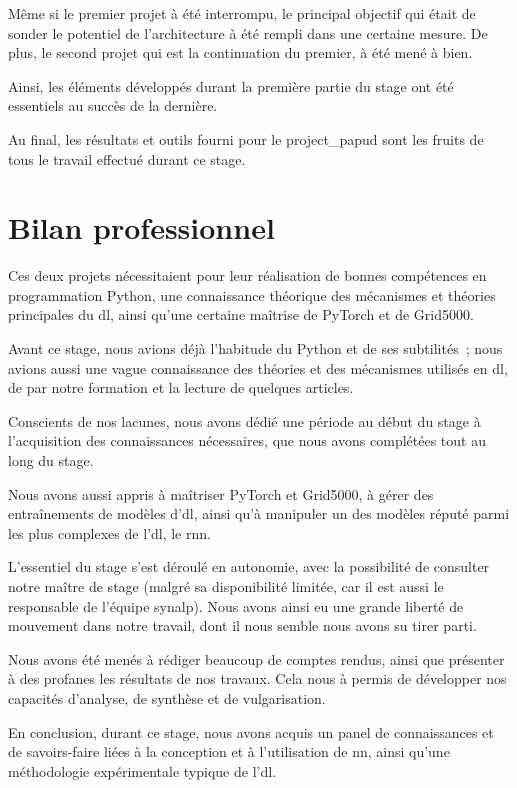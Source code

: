 Même si le premier projet à été interrompu, le principal objectif qui était de sonder le potentiel de l'architecture à été rempli dans une certaine mesure. De plus, le second projet qui est la continuation du premier, à été mené à bien.

Ainsi, les éléments développés durant la première partie du stage ont été essentiels au succès de la dernière.

Au final, les résultats et outils fourni pour le \gls{project_papud} sont les fruits de tous le travail effectué durant ce stage.

\section{Bilan professionnel}
Ces deux projets nécessitaient pour leur réalisation de bonnes compétences en programmation Python, une connaissance théorique des mécanismes et théories principales du \gls{dl}, ainsi qu'une certaine maîtrise de PyTorch et de Grid5000.

Avant ce stage, nous avions déjà l'habitude du Python et de ses subtilités~; nous avions aussi une vague connaissance des théories et des mécanismes utilisés en \gls{dl}, de par notre formation et la lecture de quelques articles.

Conscients de nos lacunes, nous avons dédié une période au début du stage à l'acquisition des connaissances nécessaires, que nous avons complétées tout au long du stage.

Nous avons aussi appris à maîtriser PyTorch et Grid5000, à gérer des entraînements de modèles d'\gls{dl}, ainsi qu'à  manipuler un des modèles réputé parmi les plus complexes de l'\gls{dl}, le \gls{rnn}.


L'essentiel du stage s'est déroulé en autonomie, avec la possibilité de consulter notre maître de stage (malgré sa disponibilité limitée, car il est aussi le responsable de l'équipe \gls{synalp}). Nous avons ainsi eu une grande liberté de mouvement dans notre travail, dont il nous semble nous avons su tirer parti.

Nous avons été menés à rédiger beaucoup de comptes rendus, ainsi que présenter à des profanes les résultats de nos travaux. Cela nous à permis de développer nos capacités d'analyse, de synthèse et de vulgarisation.

En conclusion, durant ce stage, nous avons acquis un panel de connaissances et de savoirs-faire liées à la conception et à l'utilisation de \gls{nn}, ainsi qu'une méthodologie expérimentale typique de l'\gls{dl}.

